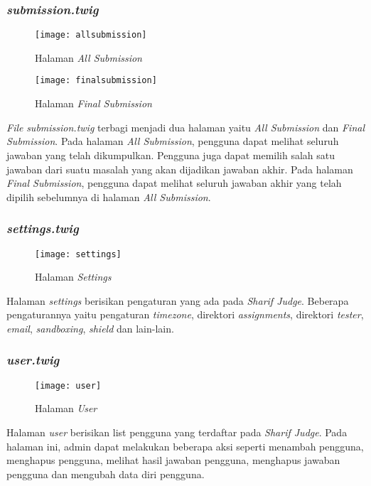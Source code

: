 \subsubsection{\textit{submission.twig}}
\begin{figure}[H]
	\centering  
	\texttt{[image: allsubmission]}  
	\caption[Halaman \textit{All Submission}]{Halaman \textit{All Submission}} 
	\label{fig:allsubmission} 
\end{figure} 

\begin{figure}[H]
	\centering  
	\texttt{[image: finalsubmission]}  
	\caption[Halaman \textit{Final Submission}]{Halaman \textit{Final Submission}} 
	\label{fig:finalsubmission} 
\end{figure} 

\textit{File} \textit{submission.twig} terbagi menjadi dua halaman yaitu \textit{All Submission} dan \textit{Final Submission}. Pada halaman \textit{All Submission}, pengguna dapat melihat seluruh jawaban yang telah dikumpulkan. Pengguna juga dapat memilih salah satu jawaban dari suatu masalah yang akan dijadikan jawaban akhir. Pada halaman \textit{Final Submission}, pengguna dapat melihat seluruh jawaban akhir yang telah dipilih sebelumnya di halaman \textit{All Submission}.

\subsubsection{\textit{settings.twig}}
\begin{figure}[H]
	\centering  
	\texttt{[image: settings]}  
	\caption[Halaman \textit{Settings}]{Halaman \textit{Settings}} 
	\label{fig:settings} 
\end{figure} 
Halaman \textit{settings} berisikan pengaturan yang ada pada \textit{Sharif Judge}. Beberapa pengaturannya yaitu pengaturan \textit{timezone}, direktori \textit{assignments}, direktori \textit{tester}, \textit{email}, \textit{sandboxing}, \textit{shield} dan lain-lain.

\subsubsection{\textit{user.twig}}
\begin{figure}[H]
	\centering  
	\texttt{[image: user]}  
	\caption[Halaman \textit{User}]{Halaman \textit{User}} 
	\label{fig:user} 
\end{figure} 
Halaman \textit{user} berisikan list pengguna yang terdaftar pada \textit{Sharif Judge}. Pada halaman ini, admin dapat melakukan beberapa aksi seperti menambah pengguna, menghapus pengguna, melihat hasil jawaban pengguna, menghapus jawaban pengguna dan mengubah data diri pengguna. 

